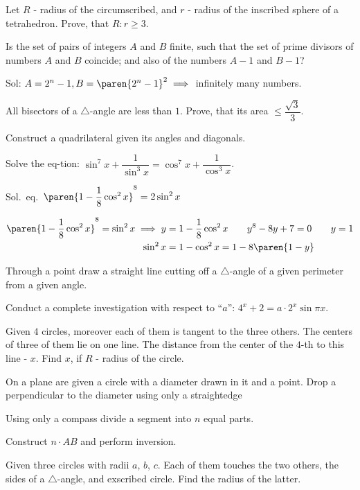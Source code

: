 \documentclass{article}
\begin{document}
\problem  %
Let $R$ - radius of the circumscribed, and $r$ - radius of the inscribed sphere of a tetrahedron.
Prove, that $R : r \geq 3$.


\problem  %
Is the set of pairs of integers $A$ and $B$ finite,
such that the set of prime divisors of numbers $A$ and $B$ coincide;
and also of the numbers $A - 1$ and $B - 1$?

Sol: $A = 2^{n} - 1, B = \paren{2^{n} - 1}^2  \implies$ infinitely many numbers.


\problem  %
All bisectors of a $\triangle$-angle are less than $1$.
Prove, that its area $\leq \dfrac{\sqrt{3}}{3}$.


\problem  %
Construct a quadrilateral given its angles and diagonals.


\problem  %
Solve the eq-tion:
$\sin^{7}{x} + \dfrac{1}{\sin^{3}{x}} = \cos^{7}{x} + \dfrac{1}{\cos^{3}{x}}$.


\problem  %
Sol.\ eq.\ $\paren{1 - \dfrac{1}{8} \cos^2 x}^{8} = 2 \sin^2 x$

\begin{align*}
  \paren{1 - \frac{1}{8} \cos^{2}{x}}^{8} = \sin^{2}{x}
  \implies
  y &= 1 - \frac{1}{8} \cos^{2}{x}
  \qquad y^{8} - 8 y + 7 = 0
  \qquad y = 1  \\
  \sin^{2}{x} &= 1 - \cos^{2}{x}
    = 1 - 8 \paren{1 - y}
\end{align*}


\problem  %
Through a point draw a straight line cutting off a $\triangle$-angle of a given perimeter from a given angle.


\problem  %
Conduct a complete investigation with respect to ``$a$'': $4^{x} + 2 = a \cdot 2^{x} \sin{\pi x}$.


\problem  %
Given $4$ circles, moreover each of them is tangent to the three others.
The centers of three of them lie on one line.
The distance from the center of the $4$-th to this line - $x$.
Find $x$, if $R$ - radius of the circle.


\problem  %
On a plane are given a circle with a diameter drawn in it and a point.
Drop a perpendicular to the diameter using only a straightedge


\problem  %
Using only a compass divide a segment into $n$ equal parts.

Construct $n \cdot AB$ and perform inversion.


\problem  %
Given three circles with radii $a$, $b$, $c$.
Each of them touches the two others, the sides of a $\triangle$-angle, and exscribed circle.
Find the radius of the latter.
\end{document}

